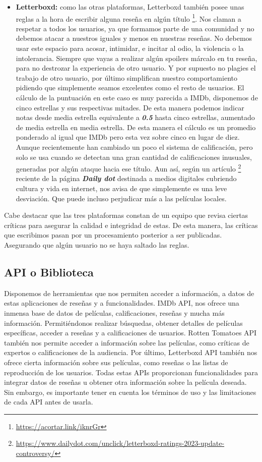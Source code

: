 \begin{itemize}
\item \textbf{Letterboxd:} como las otras plataformas, Letterboxd también posee unas reglas a la hora de escribir alguna reseña en algún título \footnote{\url{https://acortar.link/iknrGr}}. Nos claman a respetar a todos los usuarios, ya que formamos parte de una comunidad y no debemos atacar a nuestros iguales y menos en nuestras reseñas. No debemos usar este espacio para acosar, intimidar, e incitar al odio, la violencia o la intolerancia. Siempre que vayas a realizar algún spoilers márcalo en tu reseña, para no destrozar la experiencia de otro usuario. Y por supuesto no plagies el trabajo de otro usuario, por último simplifican nuestro comportamiento pidiendo que simplemente seamos excelentes como el resto de usuarios. El cálculo de la puntuación en este caso es muy parecida a IMDb, disponemos de cinco estrellas y sus respectivas mitades. De esta manera podemos indicar notas desde media estrella equivalente a \textbf{\textit{0.5}} hasta cinco estrellas, aumentado de media estrella en media estrella. De esta manera el cálculo es un promedio ponderado al igual que IMDb pero esta vez sobre cinco en lugar de diez. Aunque recientemente han cambiado un poco el sistema de calificación, pero solo se usa cuando se detectan una gran cantidad de calificaciones inusuales, generadas por algún ataque hacia ese título. Aun así, según un artículo \footnote{\url{https://www.dailydot.com/unclick/letterboxd-ratings-2023-update-controversy/}} reciente de la página \textbf{\textit{Daily dot}} destinada a medios digitales cubriendo cultura y vida en internet, nos avisa de que simplemente es una leve desviación. Que puede incluso perjudicar más a las películas locales.
\end{itemize}

Cabe destacar que las tres plataformas constan de un equipo que revisa ciertas críticas para asegurar la calidad e integridad de estas. De esta manera, las críticas que escribimos pasan por un procesamiento posterior a ser publicadas. Asegurando que algún usuario no se haya saltado las reglas.

\subsection{API o Biblioteca}

Disponemos de herramientas que nos permiten acceder a información, a datos de estas aplicaciones de 
reseñas y a funcionalidades. IMDb API, nos ofrece una inmensa base de datos de películas, 
calificaciones, reseñas y mucha más información. Permitiéndonos realizar búsquedas, obtener detalles de 
películas específicas, acceder a reseñas y a calificaciones de usuarios. Rotten Tomatoes API también 
nos permite acceder a información sobre las películas, como críticas de expertos o calificaciones de la 
audiencia. Por último, Letterboxd API también nos ofrece cierta información sobre sus películas, como 
reseñas o las listas de reproducción de los usuarios. Todas estas APIs proporcionan funcionalidades 
para integrar datos de reseñas u obtener otra información sobre la película deseada. Sin embargo, es 
importante tener en cuenta los términos de uso y las limitaciones de cada API antes de usarla.

